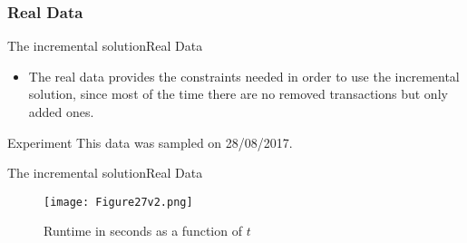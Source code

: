 \documentclass{beamer}
\begin{document}
\begin {comment}
\begin{frame}{The incremental solution}{Mock Data - Experiment II}
    \begin{figure}
        \centering
        \texttt{[image: Figure26v2.png]}
        \caption{Running time in seconds as a function of the number of 
        transactions added}
    \end{figure}
\end{frame}
\end{comment}
\subsubsection* {Real Data}
\begin{frame}{The incremental solution}{Real Data}
    \begin{itemize}
        \item {The real data provides the constraints needed in order to use 
        the incremental solution, since most of the time there are no 
        removed transactions but only added ones.}
    \end{itemize}
    \begin{block}{Experiment}
    This data was sampled on 28/08/2017. 
    \end{block}
\end{frame}

\begin{frame}{The incremental solution}{Real Data}
    \begin{figure}
        \centering
        \texttt{[image: Figure27v2.png]}
        \caption{Runtime in seconds as a function of $t$}
    \end{figure}
\end{frame}
\end{document}
